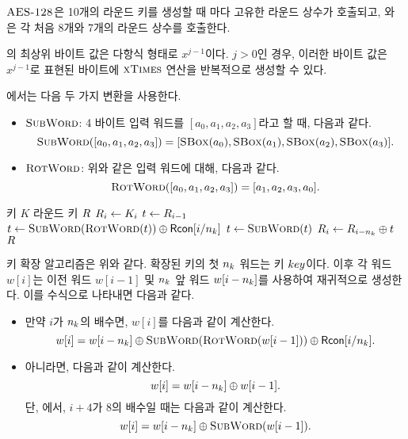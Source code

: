 \documentclass{article}
\begin{document}
$\textsc{AES-128}$은 10개의 라운드 키를 생성할 때 마다 고유한 라운드 상수가 호출되고,
 와 은 각 처음 8개와 7개의 라운드 상수를 호출한다.

\rc[j]의 최상위 바이트 값은 다항식 형태로 $x^{j-1}$이다. $j > 0$인 경우, 이러한
바이트 값은 $x^{j-1}$로 표현된 바이트에 $\textsc{xTimes}$ 연산을 반복적으로 생성할 수 있다.

\KE 에서는 다음 두 가지 변환을 사용한다.
\begin{itemize}
    \item $\textsc{SubWord}$: 4 바이트 입력 워드를 $[a_0, a_1, a_2, a_3]$라고 할 때, 다음과 같다.
    $$
        \textsc{SubWord}([a_0, a_1, a_2, a_3]) = [\textsc{SBox}(a_0), \textsc{SBox}(a_1), \textsc{SBox}(a_2), \textsc{SBox}(a_3)].
    $$
    \item $\textsc{RotWord}$: 위와 같은 입력 워드에 대해, 다음과 같다.
    $$
        \textsc{RotWord}([a_0, a_1, a_2, a_3]) = [a_1, a_2, a_3, a_0].
    $$
\end{itemize}

\begin{algorithm}
    \caption{\KE}
    \begin{algorithmic}[1]
    \Require 키 $K$
    \Ensure 라운드 키 $R$ 
            \State $R_i \gets K_i$
        \EndFor
            \State $t \gets R_{i-1}$
                \State $t \gets \textsc{SubWord}(\textsc{RotWord}(t)) \oplus \textsf{Rcon}[i/n_k]$
             
                \State $t \gets \textsc{SubWord}(t)$
            \EndIf
            \State $R_i \gets R_{i - n_k} \oplus t$
        \EndFor
        \State \Return $R$
    \EndProcedure
    \end{algorithmic}
\end{algorithm}

키 확장 알고리즘은 위와 같다. 확장된 키의 첫 $n_k$ 워드는 키 $key$이다. 이후 각
워드 $w[i]$는 이전 워드 $w[i-1]$ 및 $n_k$ 앞 워드 $w[i - n_k]$를 사용하여
재귀적으로 생성한다. 이를 수식으로 나타내면 다음과 같다.
\begin{itemize}
    \item 만약 $i$가 $n_k$의 배수면, $w[i]$를 다음과 같이 계산한다.
    $$
        w[i] = w[i - n_k] \oplus \textsc{SubWord}(\textsc{RotWord}(w[i-1])) \oplus \textsf{Rcon}[i/n_k].
    $$
    \item 아니라면, 다음과 같이 계산한다. 
    $$
        w[i] = w[i - n_k] \oplus w[i - 1].
    $$
    단, 에서, $i + 4$가 8의 배수일 때는 다음과 같이 계산한다.
    $$
        w[i] = w[i - n_k] \oplus \textsc{SubWord}(w[i-1]).
    $$
\end{itemize}
\end{document}
